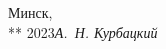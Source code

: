\begin{partbacktext}
\vspace{\baselineskip}
\begin{flushright}\noindent
Минск,\hfill {\it ~~~}\\
** 2023\hfill {\it А.~Н. Курбацкий}\\
\end{flushright}

\end{partbacktext}
